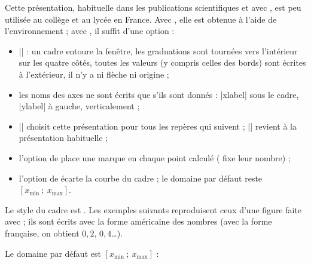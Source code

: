 Cette présentation, habituelle dans les publications scientifiques et avec , est peu utilisée au collège et au lycée en France. Avec , elle est obtenue à l'aide de l'environnement  ; avec , il suffit d'une option :

\begin{itemize}
  \item |\tkzFnAxes[box]| : un cadre entoure la fenêtre, les graduations sont tournées vers l'intérieur sur les quatre côtés, toutes les valeurs (y compris celles des bords) sont écrites à l'extérieur, il n'y a ni flèche ni origine ;
  \item les noms des axes ne sont écrits que s'ils sont donnés : |xlabel| sous le cadre, |ylabel| à gauche, verticalement ;
  \item || choisit cette présentation pour tous les repères qui suivent ; || revient à la présentation habituelle ;
  \item l'option  de  place une marque en chaque point calculé ( fixe leur nombre) ;
  \item l'option  de  écarte la courbe du cadre ; le domaine par défaut reste $[x_{\min}~;~x_{\max}]$.
\end{itemize}

Le style du cadre est . Les exemples suivants reproduisent ceux d'une figure faite avec  ; ils sont écrits avec la forme américaine des nombres (avec la forme française, on obtient $0{,}2$, $0{,}4$\dots).

\begin{tkzexample}[latex=7cm]
\end{tkzexample}

Le domaine par défaut est $[x_{\min}~;~x_{\max}]$ :

\begin{tkzexample}[latex=7cm]
\end{tkzexample}

